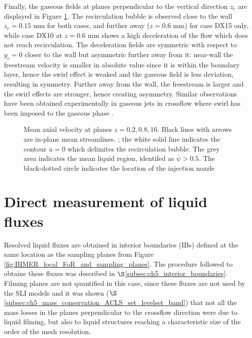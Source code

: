 Finally, the gaseous fields at planes perpendicular to the vertical direction $z_c$ are displayed in Figure \ref{fig:BIMER_turbulent_structures_planes_z}. The recirculation bubble is observed close to the wall $z_c = 0.15$ mm for both cases, and further away ($z = 0.6$ mm) for case DX15 only, while case DX10 at $z = 0.6$ mm shows a high deceleration of the flow which does not reach recirculation. The deceleration fields are symmetric with respect to $y_c = 0$ closer to the wall but asymmetric further away from it: near-wall the freestream velocity is smaller in absolute value since it is within the boundary layer, hence the swirl effect is weaked and the gaseous field is less deviation, resulting in symmetry. Further away from the wall, the freestream is larger and the swirl effects are stronger, hence creating asymmetry. Similar observations have been obtained experimentally in gaseous jets in crossflow where swirl has been imposed to the gaseous phase .



\begin{figure}[ht]
\centering
\caption[Mean axial velocity at planes $z = 0.2, 0.8, 16$ mm]{Mean axial velocity at planes $z = 0.2, 0.8, 16$. Black lines with arrows are in-plane mean streamlines. ; the white solid line indicates the contour $\overline{u} = 0$ which delimites the recirculation bubble. The grey area  indicates the mean liquid region, identifed as $\overline{\psi} > 0.5$. The black-dotted circle indicates the location of the injection nozzle}
\label{fig:BIMER_turbulent_structures_planes_z}
\end{figure}



\section{Direct measurement of liquid fluxes}
\label{sec:ch8_BIMER_IBs}

Resolved liquid fluxes are obtained in  interior boundaries (IBs) defined at the same location as the sampling planes from Figure \ref{fig:BIMER_local_FoR_and_sampling_planes}. The procedure followed to obtaine these fluxes was described in $\S$\ref{subsec:ch5_interior_boundaries}. Filming planes are not quantified in this case, since these fluxes are not used by the SLI models and it was shown ($\S$\ref{subsec:ch5_mass_conservation_ACLS_set_levelset_band}) that not all the mass losses in the planes perpendicular to the crossflow direction were due to liquid filming, but also to liquid structures reaching a characteristic size of the order of the mesh resolution.




